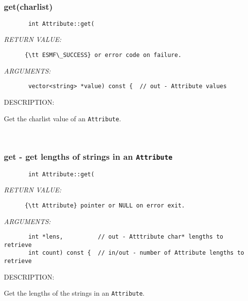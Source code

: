  
\mbox{}\hrulefill\
 
\subsubsection [get(charlist)] {get(charlist)}


  
\begin{verbatim}       int Attribute::get(
   \end{verbatim}{\em RETURN VALUE:}
\begin{verbatim}      {\tt ESMF\_SUCCESS} or error code on failure.
   \end{verbatim}{\em ARGUMENTS:}
\begin{verbatim}       vector<string> *value) const {  // out - Attribute values
   \end{verbatim}
{\sf DESCRIPTION:\\ }


      Get the charlist value of an {\tt Attribute}.
   
 
\mbox{}\hrulefill\
 
\subsubsection [get] {get - get lengths of strings in an {\tt Attribute}}


  
\begin{verbatim}       int Attribute::get(\end{verbatim}{\em RETURN VALUE:}
\begin{verbatim}      {\tt Attribute} pointer or NULL on error exit.\end{verbatim}{\em ARGUMENTS:}
\begin{verbatim}       int *lens,          // out - Atttribute char* lengths to retrieve
       int count) const {  // in/out - number of Attribute lengths to retrieve\end{verbatim}
{\sf DESCRIPTION:\\ }


      Get the lengths of the strings in an {\tt Attribute}.
   
 
